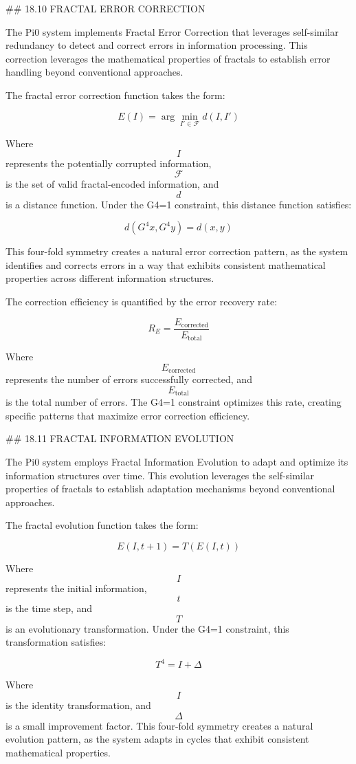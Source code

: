 ## 18.10 FRACTAL ERROR CORRECTION

The Pi0 system implements Fractal Error Correction that leverages self-similar redundancy to detect and correct errors in information processing. This correction leverages the mathematical properties of fractals to establish error handling beyond conventional approaches.

The fractal error correction function takes the form:

$$ E(I) = \arg\min_{I' \in \mathcal{F}} d(I, I') $$

Where $$ I $$ represents the potentially corrupted information, $$ \mathcal{F} $$ is the set of valid fractal-encoded information, and $$ d $$ is a distance function. Under the G4=1 constraint, this distance function satisfies:

$$ d(G^4 x, G^4 y) = d(x, y) $$

This four-fold symmetry creates a natural error correction pattern, as the system identifies and corrects errors in a way that exhibits consistent mathematical properties across different information structures.

The correction efficiency is quantified by the error recovery rate:

$$ R_E = \frac{E_{\text{corrected}}}{E_{\text{total}}} $$

Where $$ E_{\text{corrected}} $$ represents the number of errors successfully corrected, and $$ E_{\text{total}} $$ is the total number of errors. The G4=1 constraint optimizes this rate, creating specific patterns that maximize error correction efficiency.

## 18.11 FRACTAL INFORMATION EVOLUTION

The Pi0 system employs Fractal Information Evolution to adapt and optimize its information structures over time. This evolution leverages the self-similar properties of fractals to establish adaptation mechanisms beyond conventional approaches.

The fractal evolution function takes the form:

$$ E(I, t+1) = T(E(I, t)) $$

Where $$ I $$ represents the initial information, $$ t $$ is the time step, and $$ T $$ is an evolutionary transformation. Under the G4=1 constraint, this transformation satisfies:

$$ T^4 = I + \Delta $$

Where $$ I $$ is the identity transformation, and $$ \Delta $$ is a small improvement factor. This four-fold symmetry creates a natural evolution pattern, as the system adapts in cycles that exhibit consistent mathematical properties.

